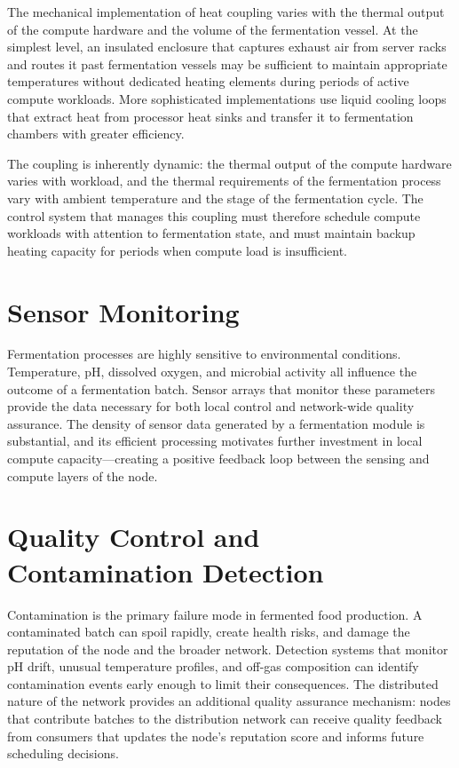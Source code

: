 \documentclass[12pt]{book}
\theoremstyle{definition}
\theoremstyle{remark}
\begin{document}
The mechanical implementation of heat coupling varies with the
thermal output of the compute hardware and the volume of the
fermentation vessel. At the simplest level, an insulated enclosure
that captures exhaust air from server racks and routes it past
fermentation vessels may be sufficient to maintain appropriate
temperatures without dedicated heating elements during periods of
active compute workloads. More sophisticated implementations use
liquid cooling loops that extract heat from processor heat sinks
and transfer it to fermentation chambers with greater efficiency.

The coupling is inherently dynamic: the thermal output of the
compute hardware varies with workload, and the thermal requirements
of the fermentation process vary with ambient temperature and the
stage of the fermentation cycle. The control system that manages
this coupling must therefore schedule compute workloads with
attention to fermentation state, and must maintain backup heating
capacity for periods when compute load is insufficient.

\section{Sensor Monitoring}

Fermentation processes are highly sensitive to environmental
conditions. Temperature, pH, dissolved oxygen, and microbial
activity all influence the outcome of a fermentation batch. Sensor
arrays that monitor these parameters provide the data necessary
for both local control and network-wide quality assurance.
The density of sensor data generated by a fermentation module
is substantial, and its efficient processing motivates further
investment in local compute capacity---creating a positive feedback
loop between the sensing and compute layers of the node.

\section{Quality Control and Contamination Detection}

Contamination is the primary failure mode in fermented food
production. A contaminated batch can spoil rapidly, create health
risks, and damage the reputation of the node and the broader
network. Detection systems that monitor pH drift, unusual
temperature profiles, and off-gas composition can identify
contamination events early enough to limit their consequences.
The distributed nature of the network provides an additional
quality assurance mechanism: nodes that contribute batches to the
distribution network can receive quality feedback from consumers
that updates the node's reputation score and informs future
scheduling decisions.
\end{document}
